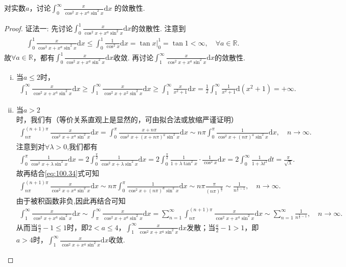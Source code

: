 \documentclass[../../main.tex]{subfiles}
\begin{document}
\begin{example}
对实数\(a\)，讨论$\int_{0}^{\infty}\frac{x}{\cos^{2}x + x^{a}\sin^{2}x}\mathrm{d}x$
的敛散性. 
\end{example}
\begin{proof}
{\color{blue}证法一:}
先讨论$\int_0^1\frac{x}{\cos^2x+x^a\sin^2x}\mathrm{d}x$的敛散性. 注意到
\begin{align*}
\int_0^1\frac{x}{\cos^2x+x^a\sin^2x}\mathrm{d}x\leqslant \int_0^1\frac{1}{\cos^2x}\mathrm{d}x=\tan x \Big |_{0}^{1}=\tan 1<\infty,\quad \forall a\in \mathbb{R}.
\end{align*}
故$\forall a\in \mathbb{R}$，都有$\int_0^1\frac{x}{\cos^2x+x^a\sin^2x}\mathrm{d}x$收敛.
再讨论$\int_1^{\infty}\frac{x}{\cos^2x+x^a\sin^2x}\mathrm{d}x$的敛散性.
\begin{enumerate}[(i)]
\item 当$a\leqslant 2$时，
\begin{align*}
\int_1^{\infty}\frac{x}{\cos^2x+x^a\sin^2x}\mathrm{d}x\geqslant \int_1^{\infty}\frac{x}{\cos^2x+x^2\sin^2x}\mathrm{d}x\geqslant \int_1^{\infty}\frac{x}{x^2+1}\mathrm{d}x=\frac{1}{2}\int_1^{\infty}\frac{1}{x^2+1}\mathrm{d}(x^2+1)=+\infty.
\end{align*}
\item 当$a>2$时，我们有（等价关系直观上是显然的，可由拟合法或放缩严谨证明）
\begin{align}
\int_{n\pi}^{(n+1)\pi}\frac{x}{\cos^2x+x^a\sin^2x}\mathrm{d}x=\int_0^{\pi}\frac{x+n\pi}{\cos^2x+(x+n\pi)^a\sin^2x}\mathrm{d}x\sim n\pi \int_0^{\pi}\frac{1}{\cos^2x+(n\pi)^a\sin^2x}\mathrm{d}x,\quad n\rightarrow \infty.\label{eq:100.34}
\end{align}
注意到对$\forall \lambda >0$,我们都有
\begin{align*}
\int_0^{\pi}\frac{1}{\cos^2x+\lambda \sin^2x}\mathrm{d}x=2\int_0^{\frac{\pi}{2}}\frac{1}{\cos^2x+\lambda \sin^2x}\mathrm{d}x=2\int_0^{\frac{\pi}{2}}\frac{1}{1+\lambda \tan^2x}\cdot \frac{1}{\cos^2x}\mathrm{d}x=2\int_0^{\infty}\frac{1}{1+\lambda t^2}dt=\frac{\pi}{\sqrt{\lambda}}.
\end{align*}
故再结合\eqref{eq:100.34}式可知
\begin{align*}
\int_{n\pi}^{(n+1)\pi}\frac{x}{\cos^2x+x^a\sin^2x}\mathrm{d}x\sim n\pi \int_0^{\pi}\frac{1}{\cos^2x+(n\pi)^a\sin^2x}\mathrm{d}x\sim n\pi \frac{\pi}{(n\pi)^{\frac{a}{2}}}\sim \frac{1}{n^{\frac{a}{2}-1}},\quad n\rightarrow \infty.
\end{align*}
由于被积函数非负,因此再结合可知
\begin{align*}
\int_1^{\infty}\frac{x}{\cos^2x+x^a\sin^2x}\mathrm{d}x\sim \int_{\pi}^{\infty}\frac{x}{\cos^2x+x^a\sin^2x}\mathrm{d}x=\sum_{n=1}^{\infty}\int_{n\pi}^{(n+1)\pi}\frac{x}{\cos^2x+x^a\sin^2x}\mathrm{d}x\sim \sum_{n=1}^{\infty}\frac{1}{n^{\frac{a}{2}-1}},\quad n\rightarrow \infty.
\end{align*}
从而当$\frac{a}{2}-1\leqslant 1$时，即$2<a\leqslant 4$，$\int_1^{\infty}\frac{x}{\cos^2x+x^a\sin^2x}\mathrm{d}x$发散；当$\frac{a}{2}-1>1$，即$a>4$时，$\int_1^{\infty}\frac{x}{\cos^2x+x^a\sin^2x}\mathrm{d}x$收敛.
\end{enumerate}


\end{proof}
\end{document}
